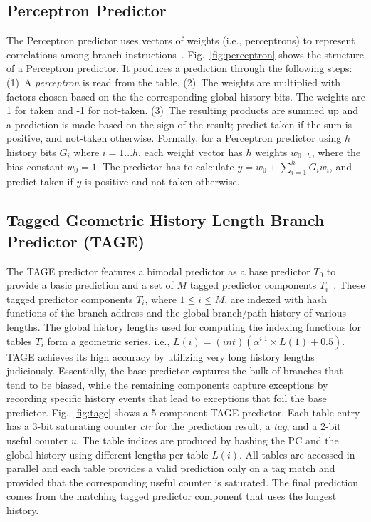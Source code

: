 \subsection{Perceptron Predictor}
\label{sec:background:dirpred:perceptron}
The Perceptron predictor uses vectors of weights (i.e., perceptrons) to represent correlations among branch instructions~\cite{perceptron}. Fig.~\ref{fig:perceptron} shows the structure of a Perceptron predictor. It produces a prediction through the following steps: (1)~A \textit{perceptron} is read from the table. (2)~The weights are multiplied with factors chosen based on the the corresponding global history bits. The weights are 1 for taken and -1 for not-taken. (3)~The resulting products are summed up and a prediction is made based on the sign of the result; predict taken if the sum is positive, and not-taken otherwise. Formally, for a Perceptron predictor using $h$ history bits $G_i$ where $i = 1...h$, each weight vector has $h$ weights $w_{0...h}$, where the bias constant $w_0 = 1$. The predictor has to calculate $y = w_0 + \sum_{i=1}^{h} G_iw_i$, and predict taken if $y$ is positive and not-taken otherwise.


\subsection{Tagged Geometric History Length Branch Predictor (TAGE)}
\label{sec:background:dirpred:tage}
The TAGE predictor features a bimodal predictor as a base predictor $T_0$ to provide a basic prediction and a set of $M$ tagged predictor components $T_i$~\cite{tage}. These tagged predictor components $T_i$, where $1\leq i\leq M$, are indexed with hash functions of the branch address and the global branch/path history of various lengths. The global history lengths used for computing the indexing functions for tables $T_i$ form a geometric series, i.e., $L(i) = (int)(\alpha^{i{}^{\_}1}\times L(1)+0.5)$. TAGE achieves its high accuracy by utilizing very long history lengths judiciously.
Essentially, the base predictor captures the bulk of branches that tend to be biased, while the remaining components capture exceptions by recording specific history events that lead to exceptions that foil the base predictor.
Fig.~\ref{fig:tage} shows a 5-component TAGE predictor. Each table entry has a 3-bit saturating counter \textit{ctr} for the prediction result, a \textit{tag}, and a 2-bit useful counter \textit{u}. The table indices are produced by hashing the PC and the global history using different lengths per table $L(i)$. All tables are accessed in parallel and each table provides a valid prediction only on a tag match and provided that the corresponding useful counter is saturated. The final prediction comes from the matching tagged predictor component that uses the longest history.


